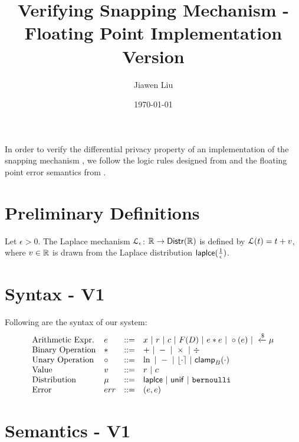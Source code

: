 \documentclass[a4paper,11pt]{article}
\begin{document}
\title{Verifying Snapping Mechanism - Floating Point Implementation Version}
\author{Jiawen Liu}

\date{\today}

\maketitle
In order to verify the differential privacy property of an implementation of the snapping mechanism \cite{mironov2012significance}, we follow the logic rules designed from \cite{barthe2016proving} and the floating point error semantics from \cite{Ramananandro2016unified,Martel2006higher,Becker2018verified,Moscato2017Automatic}.

\section{Preliminary Definitions}
\begin{defn}
Let $\epsilon > 0$. The Laplace mechanism  $\mathcal{L}_{\epsilon}$: $\mathbb{R} \to \mathsf{Distr}(\mathbb{R})$ is defined by $\mathcal{L}(t) = t + v$, where $v \in \mathbb{R}$ is drawn from the Laplace distribution $\mathsf{laplce}(\frac{1}{\epsilon})$.
\end{defn}
%
%
%
\section{Syntax - V1}
Following are the syntax of our system:
%
\[\begin{array}{llll}
\mbox{Arithmetic Expr.} & \expr & ::= & \varx 
	~|~ \rval ~|~ \fval
	~|~ F(\data) ~|~ \expr \bop \expr
	~|~ \uop (\expr) ~|~ \samplel \edistr \\
%
\mbox{Binary Operation} & \bop & ::= & + ~|~ - ~|~ \times ~|~ \div \\
%
\mbox{Unary Operation} & \uop & ::= & \ln ~|~ - ~|~ \round{\cdot} 
	~|~ \clamp_B(\cdot) \\
%
\mbox{Value} & \valv & ::= & \rval ~|~  \fval \\
%
\mbox{Distribution} & \edistr & ::= & \laplace ~|~ \uniform ~|~ \bernoulli \\ 
%
\mbox{Error} & \err & ::= & (\expr, \expr) \\
%
\end{array}
\]


\newpage
\section{Semantics - V1}
\end{document}
